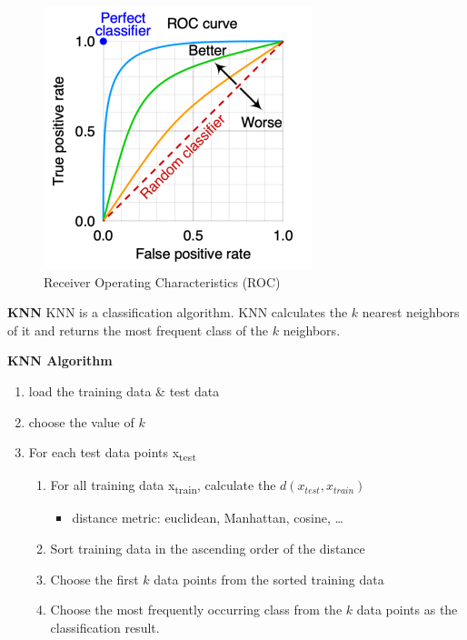 \documentclass[11pt,twoside,landscape]{article}
\begin{document}
\begin{multicols}{3}
\begin{figure}[htbp]
\centering
\includegraphics[width=.9\linewidth]{img/roc.png}
\caption{Receiver Operating Characteristics (ROC)}
\end{figure}


\textbf{KNN}
KNN is a classification algorithm.
KNN calculates the \(k\) nearest neighbors of it and returns the most frequent class of the \(k\) neighbors.


\textbf{KNN Algorithm}
\begin{enumerate}
\item load the training data \& test data
\item choose the value of \(k\)
\item For each test data points x\textsubscript{test}
\begin{enumerate}
\item For all training data x\textsubscript{train}, calculate the \(d(x_{test}, x_{train})\)
\begin{itemize}
\item distance metric: euclidean, Manhattan, cosine, \ldots{}
\end{itemize}
\item Sort training data in the ascending order of the distance
\item Choose the first \(k\) data points from the sorted training data
\item Choose the most frequently occurring class from the \(k\) data points as the classification result.
\end{enumerate}
\end{enumerate}



\end{multicols}
\end{document}
